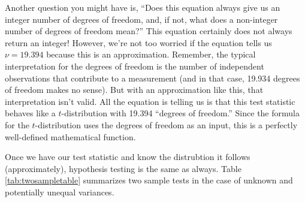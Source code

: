Another question you might have is, ``Does this equation always give us an integer number of degrees of freedom, and, if not, what does a non-integer number of degrees of freedom mean?''  This equation certainly does not always return an integer!  However, we're not too worried if the equation tells us $\nu = 19.394$ because this is an approximation.  Remember, the typical interpretation for the degrees of freedom is the number of independent observations that contribute to a measurement (and in that case, 19.934 degrees of freedom makes no sense).  But with an approximation like this, that interpretation isn't valid.  All the equation is telling us is that this test statistic behaves like a $t$-distribution with 19.394 ``degrees of freedom.''  Since the formula for the $t$-distribution uses the degrees of freedom as an input, this is a perfectly well-defined mathematical function.



Once we have our test statistic and know the distrubtion it follows (approximately), hypothesis testing is the same as always.  Table \ref{tab:twosampletable} summarizes two sample tests in the case of unknown and potentially unequal variances.



\begin{table}[h] \label{tab:twosampletable}

\begin{center}


\end{center}

\end{table}



